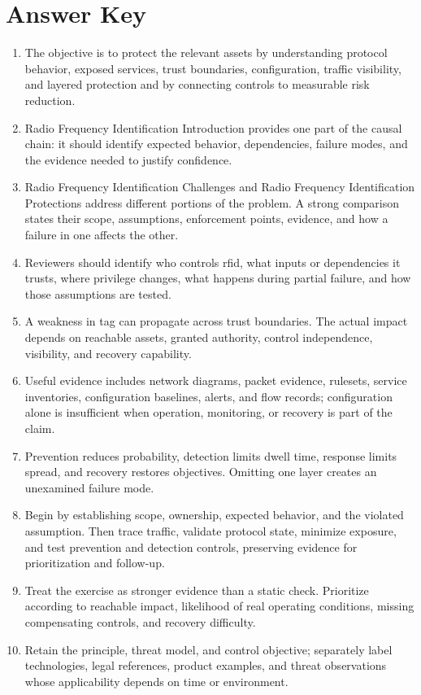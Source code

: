 \documentclass[11pt]{article}
\begin{document}
\section*{Answer Key}
\begin{enumerate}
\item The objective is to protect the relevant assets by understanding protocol behavior, exposed services, trust boundaries, configuration, traffic visibility, and layered protection and by connecting controls to measurable risk reduction.
\item Radio Frequency Identification Introduction provides one part of the causal chain: it should identify expected behavior, dependencies, failure modes, and the evidence needed to justify confidence.
\item Radio Frequency Identification Challenges and Radio Frequency Identification Protections address different portions of the problem. A strong comparison states their scope, assumptions, enforcement points, evidence, and how a failure in one affects the other.
\item Reviewers should identify who controls rfid, what inputs or dependencies it trusts, where privilege changes, what happens during partial failure, and how those assumptions are tested.
\item A weakness in tag can propagate across trust boundaries. The actual impact depends on reachable assets, granted authority, control independence, visibility, and recovery capability.
\item Useful evidence includes network diagrams, packet evidence, rulesets, service inventories, configuration baselines, alerts, and flow records; configuration alone is insufficient when operation, monitoring, or recovery is part of the claim.
\item Prevention reduces probability, detection limits dwell time, response limits spread, and recovery restores objectives. Omitting one layer creates an unexamined failure mode.
\item Begin by establishing scope, ownership, expected behavior, and the violated assumption. Then trace traffic, validate protocol state, minimize exposure, and test prevention and detection controls, preserving evidence for prioritization and follow-up.
\item Treat the exercise as stronger evidence than a static check. Prioritize according to reachable impact, likelihood of real operating conditions, missing compensating controls, and recovery difficulty.
\item Retain the principle, threat model, and control objective; separately label technologies, legal references, product examples, and threat observations whose applicability depends on time or environment.
\end{enumerate}
\end{document}
